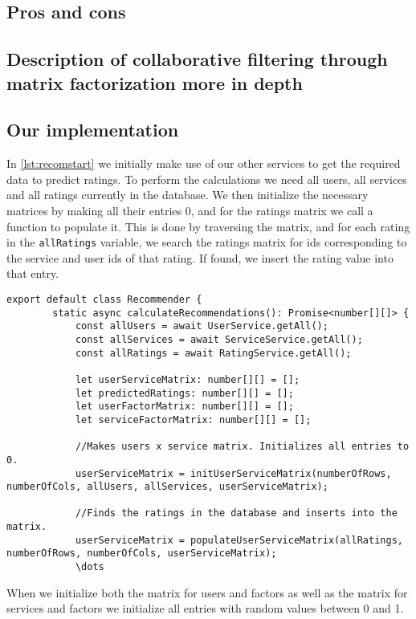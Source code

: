 \subsection{Pros and cons}


\subsection{Description of collaborative filtering through matrix factorization more in depth}

\subsection{Our implementation}
In \autoref{lst:recomstart} we initially make use of our other services to get the required data to predict ratings.
To perform the calculations we need all users, all services and all ratings currently in the database.
We then initialize the necessary matrices by making all their entries 0, and for the ratings matrix we call a function to populate it.
This is done by traversing the matrix, and for each rating in the \texttt{allRatings} variable, we search the ratings matrix for ids corresponding to the service and user ids of that rating.
If found, we insert the rating value into that entry.
\begin{lstlisting}[caption={The start of the recommender}, captionpos=b, label={lst:recomstart}]
    export default class Recommender {
        static async calculateRecommendations(): Promise<number[][]> {
            const allUsers = await UserService.getAll();
            const allServices = await ServiceService.getAll();
            const allRatings = await RatingService.getAll();
    
            let userServiceMatrix: number[][] = [];
            let predictedRatings: number[][] = [];
            let userFactorMatrix: number[][] = [];
            let serviceFactorMatrix: number[][] = [];
    
            //Makes users x service matrix. Initializes all entries to 0.
            userServiceMatrix = initUserServiceMatrix(numberOfRows, numberOfCols, allUsers, allServices, userServiceMatrix);

            //Finds the ratings in the database and inserts into the matrix.
		    userServiceMatrix = populateUserServiceMatrix(allRatings, numberOfRows, numberOfCols, userServiceMatrix);
            \dots
\end{lstlisting}
When we initialize both the matrix for users and factors as well as the matrix for services and factors we initialize all entries with random values between 0 and 1.
